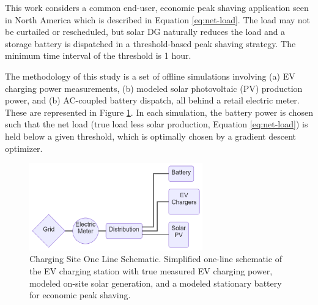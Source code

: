 \documentclass[journal,article,submit,pdftex,moreauthors]{Definitions/mdpi}
\begin{document}
This work considers a common end-user, economic peak shaving application seen in North America which is described in Equation \ref{eq:net-load}. The load may not be curtailed or rescheduled, but solar DG naturally reduces the load and a storage battery is dispatched in a threshold-based peak shaving strategy. The minimum time interval of the threshold is 1 hour.

The methodology of this study is a set of offline simulations involving (a) EV charging power measurements, (b) modeled solar photovoltaic (PV) production power, and (b) AC-coupled battery dispatch, all behind a retail electric meter. These are represented in Figure \ref{fig:oneline}. In each simulation, the battery power is chosen such that the net load (true load less solar production, Equation \ref{eq:net-load}) is held below a given threshold, which is optimally chosen by a gradient descent optimizer.

\begin{figure}
  \centering
  \includegraphics[width=7.5cm]{./images/oneline.png}
  \caption{Charging Site One Line Schematic. Simplified one-line schematic of the EV charging station with true measured EV charging power, modeled on-site solar generation, and a modeled stationary battery for economic peak shaving.}
  \label{fig:oneline}
\end{figure}
\end{document}
